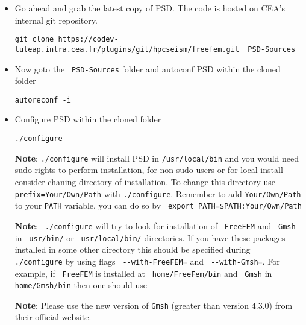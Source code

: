 \begin{itemize}
\item  Go ahead and grab the latest copy of PSD. The code is hosted on CEA's internal git repository.

\begin{lstlisting}[style=Linux]
git clone https://codev-tuleap.intra.cea.fr/plugins/git/hpcseism/freefem.git  PSD-Sources
\end{lstlisting}

\item  Now goto the \lstinline[style=Linux]! PSD-Sources! folder and autoconf PSD within the  cloned folder

\begin{lstlisting}[style=Linux]
autoreconf -i
\end{lstlisting}

\item Configure  PSD within the  cloned folder
\begin{lstlisting}[style=Linux]
./configure
\end{lstlisting}
\textbf{Note}:  \lstinline[style=Linux]!./configure! will install PSD in \lstinline[style=Linux]!/usr/local/bin! and you would need sudo rights to perform installation, for non sudo users or for local install consider chaning directory of installation. To change this directory use \lstinline[style=Linux]!--prefix=Your/Own/Path! with \lstinline[style=Linux]!./configure!. Remember to add \lstinline[style=Linux]!Your/Own/Path! to your  \lstinline[style=Linux]!PATH! variable, you can do so by \lstinline[style=Linux]! export PATH=$PATH:Your/Own/Path!

\textbf{Note}:   \lstinline[style=Linux]! ./configure! will try to look for installation of \lstinline[style=Linux]! FreeFEM! and \lstinline[style=Linux]! Gmsh! in \lstinline[style=Linux]! usr/bin/! or \lstinline[style=Linux]! usr/local/bin/! directories. If you have these packages installed in some other directory this should be specified during \lstinline[style=Linux]! ./configure! by using flags \lstinline[style=Linux]! --with-FreeFEM=! and \lstinline[style=Linux]! --with-Gmsh=!. For example, if \lstinline[style=Linux]! FreeFEM! is installed at \lstinline[style=Linux]! home/FreeFem/bin! and \lstinline[style=Linux]! Gmsh! in \lstinline[style=Linux]!home/Gmsh/bin! then one should use

\textbf{Note}: Please use the new version of \lstinline[style=Linux]!Gmsh! (greater than version 4.3.0) from their official website.


\end{itemize}
